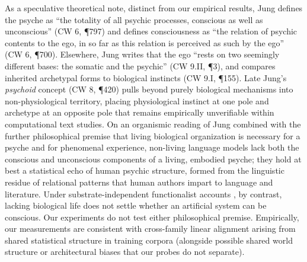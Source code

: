 \documentclass[conference]{IEEEtran}
\begin{document}
As a speculative theoretical note, distinct from our empirical results, Jung defines the psyche as ``the totality of all psychic processes, conscious as well as unconscious'' \cite{jung1971types} (CW 6, \P797) and defines consciousness as ``the relation of psychic contents to the ego, in so far as this relation is perceived as such by the ego'' \cite{jung1971types} (CW 6, \P700). Elsewhere, Jung writes that the ego ``rests on two seemingly different bases: the somatic and the psychic'' \cite{jung1968aion} (CW 9.II, \P3), and compares inherited archetypal forms to biological instincts \cite{jung1968archetypes} (CW 9.I, \P155). Late Jung's \textit{psychoid} concept \cite{jung1969structure} (CW 8, \P420) pulls beyond purely biological mechanisms into non-physiological territory, placing physiological instinct at one pole and archetype at an opposite pole that remains empirically unverifiable within computational text studies. On an organismic reading of Jung combined with the further philosophical premise that living biological organization is necessary for a psyche and for phenomenal experience, non-living language models lack both the conscious and unconscious components of a living, embodied psyche; they hold at best a statistical echo of human psychic structure, formed from the linguistic residue of relational patterns that human authors impart to language and literature. Under substrate-independent functionalist accounts \cite{chalmers2023could,butlin2023consciousness}, by contrast, lacking biological life does not settle whether an artificial system can be conscious. Our experiments do not test either philosophical premise. Empirically, our measurements are consistent with cross-family linear alignment arising from shared statistical structure in training corpora (alongside possible shared world structure or architectural biases that our probes do not separate).
\end{document}
